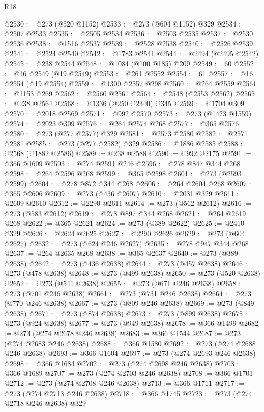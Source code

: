 \begin{lexlean}{R18}
\begin{coremodule}
{{{{{{{{{{{{{{{{{{{{{{{{{{{{{{{{{{{{{{{{{{{{{{{{{{{{{{{{{{{{{{{{{{{{{{{{{{{{{{{{{{{{{{{{{{{{{{{{{{{{{{{{{{{{{{{{{{{{{{{{{{{{{{{{{{{{{{{{{{{{{{{@2530 := @273 (@520 @1152)
@2533 := @273 (@604 @1152) @329
@2534 := @2507 @2533
@2535 := @2505 @2534
@2536 := @2503 @2535
@2537 := @2530 @2536
@2538 := @1516 @2537
@2539 := @2528 @2538
@2540 := @2526 @2539
@2541 := @2524 @2540
@2542 := @1783 @2541
@2544 := @2494 (@2495 @2542)
@2545 := @238 @2544
@2548 := @1084 (@100 @185) @209
@2549 := 60
@2552 := @16 @2549 (@19 @2549)
@2553 := @261 @2552
@2554 := 61
@2557 := @16 @2554 (@19 @2554)
@2559 := @1300 @2557 @298
@2560 := @264 @2559
@2561 := @1153 @269
@2562 := @2560 @2561
@2564 := @2548 (@2553 @2562)
@2565 := @238 @2564
@2568 := @1336 (@250 @2340) @345
@2569 := @1704 @309
@2570 := @2018 @2569
@2571 := @992 @2570
@2573 := @273 (@1423 @1559)
@2574 := @2023 @309
@2576 := @264 @2574 @268
@2577 := @365 @2576
@2580 := @273 (@277 @2577) @329
@2581 := @2573 @2580
@2582 := @2571 @2581
@2585 := @273 (@277 @2582) @329
@2586 := @1886 @2585
@2588 := @2568 (@1882 @2586)
@2589 := @238 @2588
@2590 := @992 @2175
@2591 := @366 @1609
@2593 := @274 @2591 @246
@2596 := @278 @847 @344 @268
@2598 := @264 @2596 @268
@2599 := @365 @2598
@2601 := @273 (@2593 @2599)
@2604 := @278 @872 @344 @268
@2606 := @264 @2604 @268
@2607 := @365 @2606
@2609 := @273 (@436 @2607)
@2610 := @2031 @329
@2611 := @2609 @2610
@2612 := @2290 @2611
@2614 := @273 (@562 @2612)
@2616 := @273 (@583 @2612)
@2619 := @278 @897 @344 @268
@2621 := @264 @2619 @268
@2622 := @365 @2621
@2624 := @273 (@389 @2622)
@2625 := @2410 @329
@2626 := @2624 @2625
@2627 := @2290 @2626
@2629 := @273 (@604 @2627)
@2632 := @273 (@624 @246 @2627)
@2635 := @278 @947 @344 @268
@2637 := @264 @2635 @268
@2638 := @365 @2637
@2640 := @273 (@389 @2638)
@2642 := @273 (@436 @2638)
@2644 := @273 (@457 @2638)
@2646 := @273 (@478 @2638)
@2648 := @273 (@499 @2638)
@2650 := @273 (@520 @2638)
@2652 := @273 (@541 @2638)
@2655 := @273 (@671 @246 @2638)
@2658 := @273 (@701 @246 @2638)
@2661 := @273 (@731 @246 @2638)
@2664 := @273 (@770 @246 @2638)
@2667 := @273 (@809 @246 @2638)
@2669 := @273 (@849 @2638)
@2671 := @273 (@874 @2638)
@2673 := @273 (@899 @2638)
@2675 := @273 (@924 @2638)
@2677 := @273 (@949 @2638)
@2678 := @366 @1499
@2682 := @273 (@274 @2678 @246 @2638)
@2683 := @366 @1544
@2687 := @273 (@274 @2683 @246 @2638)
@2688 := @366 @1580
@2692 := @273 (@274 @2688 @246 @2638)
@2693 := @366 @1604
@2697 := @273 (@274 @2693 @246 @2638)
@2698 := @366 @1684
@2702 := @273 (@274 @2698 @246 @2638)
@2703 := @366 @1689
@2707 := @273 (@274 @2703 @246 @2638)
@2708 := @366 @1701
@2712 := @273 (@274 @2708 @246 @2638)
@2713 := @366 @1711
@2717 := @273 (@274 @2713 @246 @2638)
@2718 := @366 @1745
@2723 := @273 (@274 @2718 @246 @2638) @329
}}}}}}}}}}}}}}}}}}}}}}}}}}}}}}}}}}}}}}}}}}}}}}}}}}}}}}}}}}}}}}}}}}}}}}}}}}}}}}}}}}}}}}}}}}}}}}}}}}}}}}}}}}}}}}}}}}}}}}}}}}}}}}}}}}}}}}}}}}}}}}}
\end{coremodule}
\end{lexlean}
